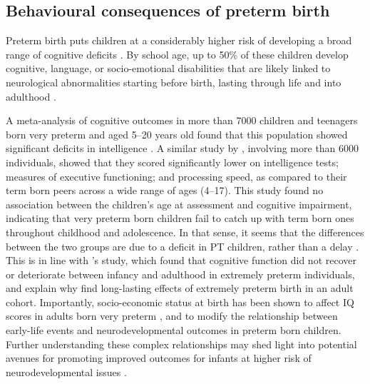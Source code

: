 \subsection{Behavioural consequences of preterm birth}

Preterm birth puts children at a considerably higher risk of developing a broad range of cognitive deficits \citep{Brydges2018, Twilhaar2018}. %
By school age, up to 50\% of these children develop cognitive, language, or socio-emotional disabilities that are likely linked to neurological abnormalities starting before birth, lasting through life and into adulthood \citep{Gozzo2009, Chaminade2013, Moiseev2014, Hornman2016, Thomason2017, Burnett2018}.

A meta-analysis of cognitive outcomes in more than 7000 children and teenagers born very preterm and aged 5--20 years old found that this population showed significant deficits in intelligence \cite{Twilhaar2018}. A similar study by \citet{Brydges2018}, involving more than 6000 individuals, showed that they scored significantly lower on intelligence tests; measures of executive functioning; and processing speed, as compared to their term born peers across a wide range of ages (4--17). This study found no association between the children's age at assessment and cognitive impairment, indicating that very preterm born children fail to catch up with term born ones throughout childhood and adolescence. In that sense, it seems that the differences between the two groups are due to a deficit in PT children, rather than a delay \citep{Brydges2018}. This is in line with \citep{Linsell2018}'s study, which found that cognitive function did not recover or deteriorate between infancy and adulthood in extremely preterm individuals, and explain why \cite{Doyle2010} find long-lasting effects of extremely preterm birth in an adult cohort. Importantly, socio-economic status at birth has been shown to affect IQ scores in adults born very preterm \citep{Breeman2017}, and to modify the relationship between early-life events and neurodevelopmental outcomes in preterm born children. Further understanding these complex relationships may shed light into potential avenues for promoting improved outcomes for infants at higher risk of neurodevelopmental issues \citep{Benavente-Fernandez2020}. 

